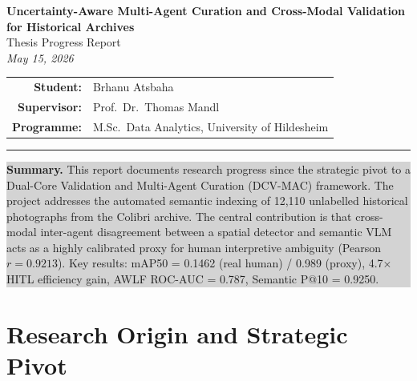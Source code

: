 \documentclass[11pt,a4paper]{article}
\theoremstyle{plain}
\begin{document}
\begin{center}
  {\LARGE\bfseries Uncertainty-Aware Multi-Agent Curation and Cross-Modal Validation for Historical Archives}\\[8pt]
  {\large Thesis Progress Report}\\[6pt]
  {\normalsize\textit{May 15, 2026}}\\[10pt]
  \begin{tabular}{rl}
    \textbf{Student:}    & Brhanu Atsbaha \\
    \textbf{Supervisor:} & Prof.\ Dr.\ Thomas Mandl \\
    \textbf{Programme:}  & M.Sc.\ Data Analytics, University of Hildesheim \\
  \end{tabular}
\end{center}

\vspace{4pt}
\noindent\rule{\linewidth}{1pt}
\vspace{6pt}

\begin{center}
\colorbox{lightgray}{\parbox{0.96\linewidth}{\vspace{4pt}\small
\textbf{Summary.} This report documents research progress since the strategic pivot to a Dual-Core Validation and Multi-Agent Curation (DCV-MAC) framework. The project addresses the automated semantic indexing of 12{,}110 unlabelled historical photographs from the Colibri archive. The central contribution is that cross-modal inter-agent disagreement between a spatial detector and semantic VLM acts as a highly calibrated proxy for human interpretive ambiguity (Pearson $r = 0.9213$). Key results: mAP50 = 0.1462 (real human) / 0.989 (proxy), 4.7$\times$ HITL efficiency gain, AWLF ROC-AUC = 0.787, Semantic P@10 = 0.9250.
\vspace{4pt}}}
\end{center}

\vspace{10pt}

\section{Research Origin and Strategic Pivot}
\end{document}
